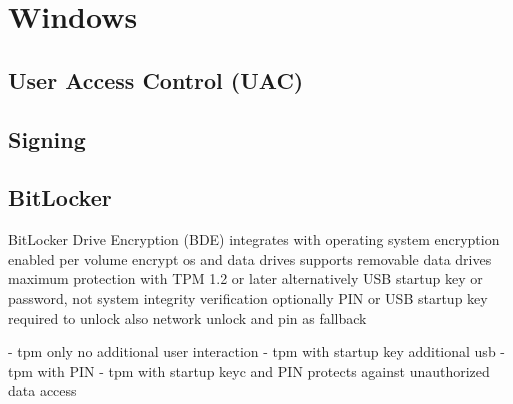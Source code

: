 
\section{Windows}
\subsection{User Access Control (UAC)}
\subsection{Signing}
\subsection{BitLocker}


BitLocker Drive Encryption (BDE) integrates with operating system
encryption enabled per volume
encrypt os and data drives
supports removable data drives
maximum protection with TPM 1.2 or later
alternatively USB startup key or password, not system integrity verification
optionally PIN or USB startup key required to unlock
also network unlock and pin as fallback

- tpm only
no additional user interaction
- tpm with startup key
additional usb
- tpm with PIN
- tpm with startup keyc and PIN
protects against unauthorized data access

